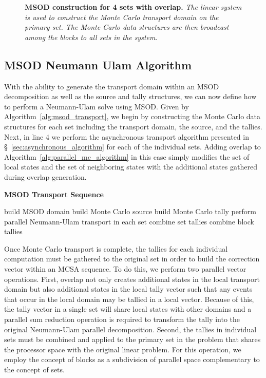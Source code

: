 \begin{figure}[t!]
  \begin{center}
    \scalebox{0.55}{  }
  \end{center}
  \caption{\textbf{MSOD construction for 4 sets with overlap.}
    \textit{The linear system is used to construct the Monte Carlo
      transport domain on the primary set. The Monte Carlo data
      structures are then broadcast among the blocks to all sets in
      the system.}}
  \label{fig:msod_construction}
\end{figure}

\clearpage

\subsection{MSOD Neumann Ulam Algorithm }
\label{subsec:msod_algorithm}

With the ability to generate the transport domain within an MSOD
decomposition as well as the source and tally structures, we can now
define how to perform a Neumann-Ulam solve using MSOD. Given by
Algorithm~\ref{alg:msod_transport}, we begin by constructing the Monte
Carlo data structures for each set including the transport domain, the
source, and the tallies. Next, in line 4 we perform the asynchronous
transport algorithm presented in \S~\ref{sec:asynchronous_algorithm}
for each of the individual sets. Adding overlap to
Algorithm~\ref{alg:parallel_mc_algorithm} in this case simply modifies
the set of local states and the set of neighboring states with the
additional states gathered during overlap generation.

\begin{algorithm}[h!]
  \caption{\textbf{MSOD Transport Sequence}}
  \label{alg:msod_transport}
  \begin{algorithmic}[1]
    \State build MSOD domain
    \State build Monte Carlo source
    \State build Monte Carlo tally
    \State perform parallel Neumann-Ulam transport in each set
    \State combine set tallies
    \State combine block tallies
  \end{algorithmic}
\end{algorithm}

Once Monte Carlo transport is complete, the tallies for each
individual computation must be gathered to the original set in order
to build the correction vector within an MCSA sequence. To do this, we
perform two parallel vector operations. First, overlap not only
creates additional states in the local transport domain but also
additional states in the local tally vector such that any events that
occur in the local domain may be tallied in a local vector. Because of
this, the tally vector in a single set will share local states with
other domains and a parallel sum reduction operation is required to
transform the tally into the original Neumann-Ulam parallel
decomposition. Second, the tallies in individual sets must be combined
and applied to the primary set in the problem that shares the
processor space with the original linear problem. For this operation,
we employ the concept of blocks as a subdivision of parallel space
complementary to the concept of sets.

